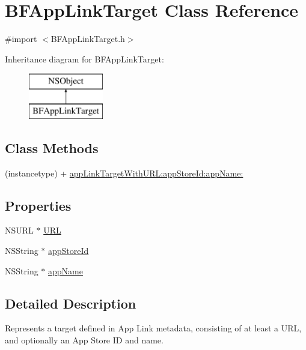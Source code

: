 \hypertarget{interface_b_f_app_link_target}{}\section{B\+F\+App\+Link\+Target Class Reference}
\label{interface_b_f_app_link_target}


{\ttfamily \#import $<$B\+F\+App\+Link\+Target.\+h$>$}

Inheritance diagram for B\+F\+App\+Link\+Target\+:\begin{figure}[H]
\begin{center}
\leavevmode
\includegraphics[height=2.000000cm]{interface_b_f_app_link_target}
\end{center}
\end{figure}
\subsection*{Class Methods}
\begin{DoxyCompactItemize}
\item 
(instancetype) + \hyperlink{interface_b_f_app_link_target_ac6fb7dff9ff2a0d152ecd023035a08c2}{app\+Link\+Target\+With\+U\+R\+L\+:app\+Store\+Id\+:app\+Name\+:}
\end{DoxyCompactItemize}
\subsection*{Properties}
\begin{DoxyCompactItemize}
\item 
N\+S\+U\+R\+L $\ast$ \hyperlink{interface_b_f_app_link_target_a709dbbdd1a196272352283877f45783e}{U\+R\+L}
\item 
N\+S\+String $\ast$ \hyperlink{interface_b_f_app_link_target_ac7750ffc69198f8bf2ddbed9046eca60}{app\+Store\+Id}
\item 
N\+S\+String $\ast$ \hyperlink{interface_b_f_app_link_target_afc6ca12bba8d553ec5235d580e6e53d3}{app\+Name}
\end{DoxyCompactItemize}


\subsection{Detailed Description}
Represents a target defined in App Link metadata, consisting of at least a U\+R\+L, and optionally an App Store I\+D and name. 

